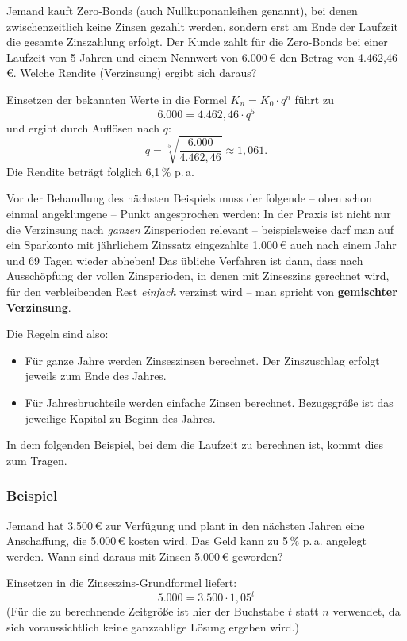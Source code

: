 Jemand kauft Zero-Bonds (auch Nullkuponanleihen genannt), bei denen zwischenzeitlich keine Zinsen gezahlt werden, sondern erst am Ende der Laufzeit die gesamte Zinszahlung erfolgt. Der Kunde zahlt für die Zero-Bonds bei einer Laufzeit von 5 Jahren und einem Nennwert von 6.000\,€ den Betrag von 4.462{,}46\,€. Welche Rendite (Verzinsung) ergibt sich daraus?

Einsetzen der bekannten Werte in die Formel $K_n = K_0 \cdot q^n$ führt zu
\[ 6.000 = 4.462{,}46 \cdot q^5 \]
und ergibt durch Auflösen nach $q$:
\[ q = \sqrt[5]{\frac{6.000}{4.462{,}46}} \approx 1{,}061 . \]
Die Rendite beträgt folglich 6{,}1\,\% p.\,a.\beispielende

Vor der Behandlung des nächsten Beispiels muss der folgende -- oben schon einmal angeklungene -- Punkt angesprochen werden: In der Praxis ist nicht nur die Verzinsung nach \emph{ganzen} Zinsperioden relevant -- beispielsweise darf man auf ein Sparkonto mit jährlichem Zinssatz eingezahlte 1.000\,€ auch nach einem Jahr und 69 Tagen wieder abheben! Das übliche Verfahren ist dann, dass nach Ausschöpfung der vollen Zinsperioden, in denen mit Zinseszins gerechnet wird, für den verbleibenden Rest \emph{einfach} verzinst wird -- man spricht von \textbf{gemischter Verzinsung}.

Die Regeln sind also:
\begin{itemize}
  \item Für ganze Jahre werden Zinseszinsen berechnet. Der Zinszuschlag erfolgt jeweils zum Ende des Jahres.
  \item Für Jahresbruchteile werden einfache Zinsen berechnet. Bezugsgröße ist das jeweilige Kapital zu Beginn des Jahres.
\end{itemize}

In dem folgenden Beispiel, bei dem die Laufzeit zu berechnen ist, kommt dies zum Tragen.

\subsubsection{Beispiel}

Jemand hat 3.500\,€ zur Verfügung und plant in den nächsten Jahren eine Anschaffung, die 5.000\,€ kosten wird. Das Geld kann zu 5\,\% p.\,a. angelegt werden. Wann sind daraus mit Zinsen 5.000\,€ geworden?

Einsetzen in die Zinseszins-Grundformel liefert:
\[ 5.000 = 3.500 \cdot 1{,}05^t \]
(Für die zu berechnende Zeitgröße ist hier der Buchstabe $t$ statt $n$ verwendet, da sich voraussichtlich keine ganzzahlige Lösung ergeben wird.)

